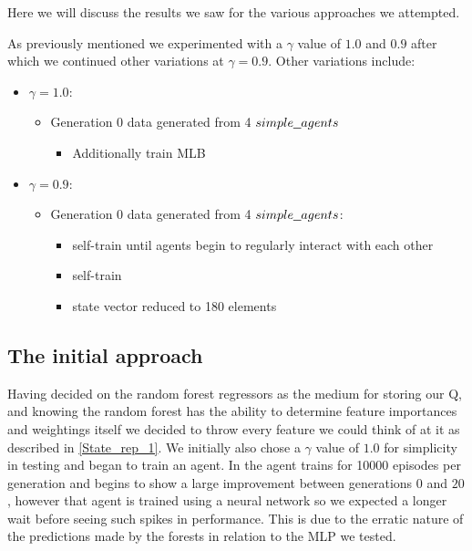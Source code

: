 Here we will discuss the results we saw for the various approaches we attempted.

As previously mentioned we experimented with a $\gamma$ value of $1.0$ and $0.9$ after which we continued other variations at $\gamma = 0.9$.
Other variations include:
\begin{itemize}
	\item $\gamma = 1.0$:
	\begin{itemize}
		\item Generation 0 data generated from 4 $\code{simple\_agents}$
		\begin{itemize}
			\item Additionally train MLB
		\end{itemize}
	\end{itemize}
	\item $\gamma = 0.9$:
	\begin{itemize}
		\item Generation 0 data generated from 4 $\code{simple\_agents}$:
		\begin{itemize}
			\item self-train until agents begin to regularly interact with each other
			\item self-train
			\item state vector reduced to 180 elements
		\end{itemize}
	\end{itemize}
\end{itemize}

\subsection{The initial approach}
Having decided on the random forest regressors as the medium for storing our Q, and knowing the random forest has the ability to determine feature importances and weightings itself we decided to throw every feature we could think of at it as described in \ref{State_rep_1}. We initially also chose a $\gamma$ value of $1.0$ for simplicity in testing and began to train an agent. In \cite{paper} the agent trains for 10000 episodes per generation and begins to show a large improvement between generations $0$ and $20$, however that agent is trained using a neural network so we expected a longer wait before seeing such spikes in performance. This is due to the erratic nature of the predictions made by the forests in relation to the MLP we tested.

